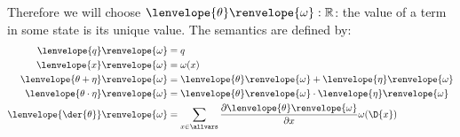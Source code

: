 \documentclass[12pt]{cmuthesis}
\theoremstyle{definition}
\theoremstyle{remark}
\newcommand{\om}{\omega}
\newcommand{\CdGL}{\textsf{CdGL}\xspace}
\newcommand{\tint}[2]{\lenvelope{#1}\renvelope{#2}}
\newcommand{\fint}[1]{\lenvelope{#1}\renvelope}
\begin{document}
Therefore we will choose $\tint{\theta}{\om} : \mathbb{R}$: the value of a term in some state is its unique value.
The semantics are defined by:
\begin{align*}
  \tint{q}{\om} &= q\\
  \tint{x}{\om} &= \om(x)\\
  \tint{\theta + \eta}{\om} &= \tint{\theta}{\om} + \tint{\eta}{\om}\\
  \tint{\theta \cdot \eta}{\om} &= \tint{\theta}{\om} \cdot \tint{\eta}{\om}\\
  \tint{\der{\theta}}{\om} &= \sum_{x\in\allvars}\frac{\partial\tint{\theta}{\om}}{\partial x}\om(\D{x})
\end{align*}
\end{document}
